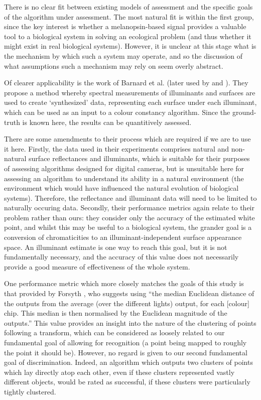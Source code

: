 There is no clear fit between existing models of assessment and the specific goals of the algorithm under assessment. The most natural fit is within the first group, since the key interest is whether a melanopsin-based signal provides a valuable tool to a biological system in solving an ecological problem (and thus whether it might exist in real biological systems). However, it is unclear at this stage what is the mechanism by which such a system may operate, and so the discussion of what assumptions such a mechanism may rely on seem overly abstract.

Of clearer applicability is the work of Barnard et al. \cite{barnard_comparison_2002} (later used by \citet{hordley_reevaluation_2006} and \citet{gijsenij_computational_2011}). They propose a method whereby spectral measurements of illuminants and surfaces are used to create `synthesized' data, representing each surface under each illuminant, which can be used as an input to a colour constancy algorithm. Since the ground-truth is known here, the results can be quantitively assessed. 

There are some amendments to their process which are required if we are to use it here. Firstly, the data used in their experiments comprises natural and non-natural surface reflectances and illuminants, which is suitable for their purposes of assessing algorithms designed for digital cameras, but is unsuitable here for assessing an algorithm to understand its ability in a natural environment (the environment which would have influenced the natural evolution of biological systems). Therefore, the reflectance and illuminant data will need to be limited to naturally occuring data. Secondly, their performance metrics again relate to their problem rather than ours: they consider only the accuracy of the estimated white point, and whilst this may be useful to a biological system, the grander goal is a conversion of chromaticities to an illuminant-independent surface appearance space. An illuminant estimate is one way to reach this goal, but it is not fundamentally necessary, and the accuracy of this value does not necessarily provide a good measure of effectiveness of the whole system.

One performance metric which more closely matches the goals of this study is that provided by Forsyth \cite[p.~19]{forsyth_novel_1990}, who suggests using ``the median Euclidean distance of the outputs from the average (over the different lights) output, for each [colour] chip. This median is then normalised by the Euclidean magnitude of the outputs.'' This value provides an insight into the nature of the clustering of points following a transform, which can be considered as loosely related to our fundamental goal of allowing for recognition (a point being mapped to roughly the point it should be). However, no regard is given to our second fundamental goal of discrimination. Indeed, an algorithm which outputs two clusters of points which lay directly atop each other, even if these clusters represented vastly different objects, would be rated as successful, if these clusters were particularly tightly clustered.

